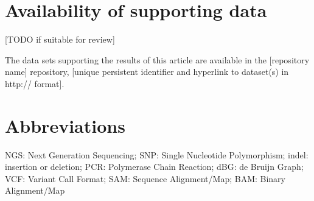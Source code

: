 \documentclass{bmcart}
\begin{document}
\section*{Availability of supporting data}
[TODO if suitable for review]

The data sets supporting the results of this article are available in the [repository name] repository, [unique persistent identifier and hyperlink to dataset(s) in http:// format].


\section*{Abbreviations}
NGS: Next Generation Sequencing; SNP: Single Nucleotide Polymorphism; indel: insertion or deletion; PCR: Polymerase Chain Reaction; dBG: de Bruijn Graph; VCF: Variant Call Format; SAM: Sequence Alignment/Map; BAM: Binary Alignment/Map






\end{document}
